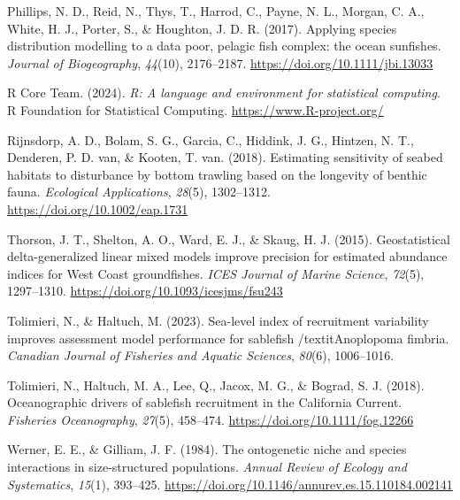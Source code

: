 \documentclass[
]{article}
\newlength{\cslhangindent}
\newenvironment{CSLReferences}[2] %
 {\begin{list}{}{%
  \setlength{\itemindent}{0pt}
  \setlength{\leftmargin}{0pt}
  \setlength{\parsep}{0pt}
  \ifodd #1
   \setlength{\leftmargin}{\cslhangindent}
   \setlength{\itemindent}{-1\cslhangindent}
  \fi
  \setlength{\itemsep}{#2\baselineskip}}}
 {\end{list}}
\begin{document}
\begin{CSLReferences}{1}{0}
Phillips, N. D., Reid, N., Thys, T., Harrod, C., Payne, N. L., Morgan,
C. A., White, H. J., Porter, S., \& Houghton, J. D. R. (2017). {Applying
species distribution modelling to a data poor, pelagic fish complex: the
ocean sunfishes}. \emph{Journal of Biogeography}, \emph{44}(10),
2176--2187. \url{https://doi.org/10.1111/jbi.13033}

R Core Team. (2024). \emph{{R: A language and environment for
statistical computing}}. R Foundation for Statistical Computing.
\url{https://www.R-project.org/}

Rijnsdorp, A. D., Bolam, S. G., Garcia, C., Hiddink, J. G., Hintzen, N.
T., Denderen, P. D. van, \& Kooten, T. van. (2018). {Estimating
sensitivity of seabed habitats to disturbance by bottom trawling based
on the longevity of benthic fauna}. \emph{Ecological Applications},
\emph{28}(5), 1302--1312. \url{https://doi.org/10.1002/eap.1731}

Thorson, J. T., Shelton, A. O., Ward, E. J., \& Skaug, H. J. (2015).
{Geostatistical delta-generalized linear mixed models improve precision
for estimated abundance indices for West Coast groundfishes}. \emph{ICES
Journal of Marine Science}, \emph{72}(5), 1297--1310.
\url{https://doi.org/10.1093/icesjms/fsu243}

Tolimieri, N., \& Haltuch, M. (2023). {Sea-level index of recruitment
variability improves assessment model performance for sablefish
/textit{Anoplopoma fimbria}}. \emph{Canadian Journal of Fisheries and
Aquatic Sciences}, \emph{80}(6), 1006--1016.

Tolimieri, N., Haltuch, M. A., Lee, Q., Jacox, M. G., \& Bograd, S. J.
(2018). {Oceanographic drivers of sablefish recruitment in the
California Current}. \emph{Fisheries Oceanography}, \emph{27}(5),
458--474. \url{https://doi.org/10.1111/fog.12266}

Werner, E. E., \& Gilliam, J. F. (1984). {The ontogenetic niche and
species interactions in size-structured populations}. \emph{Annual
Review of Ecology and Systematics}, \emph{15}(1), 393--425.
\url{https://doi.org/10.1146/annurev.es.15.110184.002141}

\end{CSLReferences}

\break
\clearpage
\end{document}
